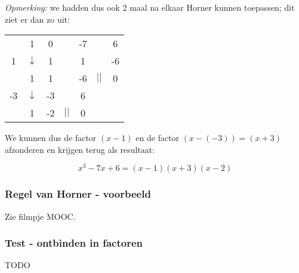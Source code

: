 \begin{voorbeeld}
\emph{Opmerking:} we hadden dus ook 2 maal na elkaar Horner kunnen toepassen; dit ziet er dan zo uit:


\begin{center}
	\begin{tabular}{c|cccccc}
		& 1 & 0 & &-7 & & 6 \\
		1 & $\downarrow$ & 1 & & 1 & & -6\\
		\hline 
		& 1 & 1 & & -6 & $||$ & 0 \\
		-3 & $\downarrow$ & -3 & & 6 & &\\
		\hline
		& 1 & -2 & $||$ & 0 &
	\end{tabular}
\end{center}


We kunnen dus de factor $(x-1)$ en de factor $(x-(-3))=(x+3)$ afzonderen en krijgen terug als resultaat:

\begin{equation*}
x^3-7x+6=(x-1)(x+3)(x-2)
\end{equation*}
\end{voorbeeld}

\subsubsection{Regel van Horner - voorbeeld}
Zie filmpje MOOC.

\subsubsection{Test - ontbinden in factoren}
TODO